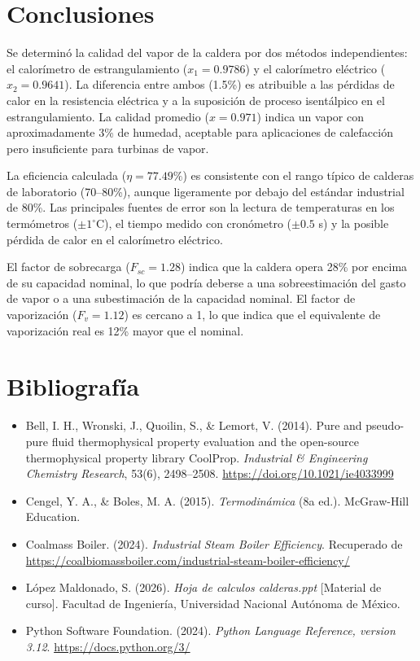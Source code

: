 \documentclass[12pt,letterpaper]{article}
\begin{document}
\section{Conclusiones}

Se determinó la calidad del vapor de la caldera por dos métodos independientes:
el calorímetro de estrangulamiento ($x_1 = 0.9786$) y el calorímetro eléctrico
($x_2 = 0.9641$). La diferencia entre ambos (1.5\%) es atribuible a las pérdidas
de calor en la resistencia eléctrica y a la suposición de proceso isentálpico
en el estrangulamiento. La calidad promedio ($x = 0.971$) indica un vapor con
aproximadamente 3\% de humedad, aceptable para aplicaciones de calefacción pero
insuficiente para turbinas de vapor.

La eficiencia calculada ($\eta = 77.49\%$) es consistente con el rango típico
de calderas de laboratorio (70--80\%), aunque ligeramente por debajo del estándar
industrial de 80\%. Las principales fuentes de error son la lectura de temperaturas
en los termómetros ($\pm 1^\circ$C), el tiempo medido con cronómetro ($\pm 0.5$ s)
y la posible pérdida de calor en el calorímetro eléctrico.

El factor de sobrecarga ($F_{sc} = 1.28$) indica que la caldera opera 28\% por
encima de su capacidad nominal, lo que podría deberse a una sobreestimación del
gasto de vapor o a una subestimación de la capacidad nominal. El factor de
vaporización ($F_v = 1.12$) es cercano a 1, lo que indica que el
equivalente de vaporización real es 12\% mayor que el nominal.

\section{Bibliografía}

\begin{itemize}
    \item Bell, I. H., Wronski, J., Quoilin, S., \& Lemort, V. (2014). 
    Pure and pseudo-pure fluid thermophysical property evaluation and 
    the open-source thermophysical property library CoolProp. 
    \textit{Industrial \& Engineering Chemistry Research}, 53(6), 
    2498--2508. \url{https://doi.org/10.1021/ie4033999}
    
    \item Cengel, Y. A., \& Boles, M. A. (2015). 
    \textit{Termodinámica} (8a ed.). McGraw-Hill Education.
    
    \item Coalmass Boiler. (2024). \textit{Industrial Steam Boiler Efficiency}. 
    Recuperado de 
    \url{https://coalbiomassboiler.com/industrial-steam-boiler-efficiency/}
    
    \item López Maldonado, S. (2026). \textit{Hoja de calculos calderas.ppt} [Material de curso]. 
    Facultad de Ingeniería, Universidad Nacional Autónoma de México.
    
    \item Python Software Foundation. (2024). \textit{Python Language 
    Reference, version 3.12}. \url{https://docs.python.org/3/}
\end{itemize}
\end{document}
